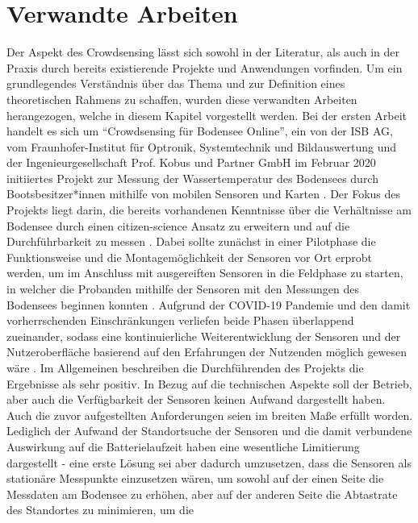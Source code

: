 \section{Verwandte Arbeiten}
Der Aspekt des Crowdsensing lässt sich sowohl in der Literatur, als auch in der Praxis durch bereits existierende Projekte und Anwendungen vorfinden. Um ein grundlegendes Verständnis über das Thema und zur Definition eines theoretischen Rahmens zu schaffen, wurden diese verwandten 
Arbeiten herangezogen, welche in diesem Kapitel vorgestellt werden. \newline Bei der ersten Arbeit handelt es sich um \enquote{Crowdsensing für Bodensee Online}, ein von der ISB AG, vom Fraunhofer-Institut für Optronik, Systemtechnik und Bildauswertung und der Ingenieurgesellschaft Prof. Kobus und Partner GmbH 
im Februar 2020 initiiertes Projekt zur Messung der Wassertemperatur des Bodensees durch Bootsbesitzer*innen mithilfe von mobilen Sensoren und Karten \cite{Ministerium2021}. Der Fokus des Projekts liegt darin, die bereits vorhandenen Kenntnisse über die Verhältnisse am Bodensee durch einen citizen-science Ansatz zu erweitern und 
auf die Durchführbarkeit zu messen \cite{Bodensee2021}. Dabei sollte zunächst in einer Pilotphase die Funktionsweise und die Montagemöglichkeit der Sensoren vor Ort erprobt werden, um im Anschluss mit ausgereiften Sensoren in die Feldphase zu starten, in welcher die Probanden mithilfe der Sensoren mit den Messungen des Bodensees 
beginnen konnten \cite{Bodensee2021}. Aufgrund der COVID-19 Pandemie und den damit vorherrschenden Einschränkungen verliefen beide Phasen überlappend zueinander, sodass eine kontinuierliche Weiterentwicklung der Sensoren und der Nutzeroberfläche basierend auf den Erfahrungen der Nutzenden möglich gewesen wäre \cite{Bodensee2021}. 
Im Allgemeinen beschreiben die Durchführenden des Projekts die Ergebnisse als sehr positiv. \newline In Bezug auf die technischen Aspekte soll der Betrieb, aber auch die Verfügbarkeit der Sensoren keinen Aufwand dargestellt haben. Auch die zuvor aufgestellten Anforderungen seien im breiten Maße erfüllt worden. Lediglich der Aufwand der Standortsuche der Sensoren 
und die damit verbundene Auswirkung auf die Batterielaufzeit haben eine wesentliche Limitierung dargestellt - eine erste Lösung sei aber dadurch umzusetzen, dass die Sensoren als stationäre Messpunkte einzusetzen wären, um sowohl auf der einen Seite die Messdaten am Bodensee zu erhöhen, aber auf der anderen Seite die Abtastrate des Standortes zu minimieren, um die 
